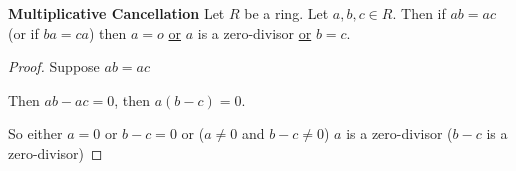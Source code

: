 \begin{thm}\textbf{Multiplicative Cancellation}
Let $R$ be a ring. Let $a,b,c\in R$. Then if $ab = ac$ (or if $ba = ca$) then $a=o$ \underline{or} $a$ is a zero-divisor \underline{or} $b=c$.
\end{thm}
\begin{proof}
Suppose $ab = ac$

Then $ab -ac = 0$, then $a(b-c) = 0$.

So either $a=0$ or $b-c = 0$ or ($a\neq 0$ and $b-c\neq 0$) $a$ is a zero-divisor ($b-c$ is a zero-divisor)
\end{proof}